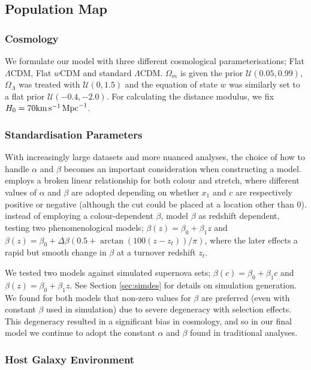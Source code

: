 \documentclass[a4paper,fleqn,usenatbib]{mnras}
\newcommand{\kmsmpc}{{\rm km}\,{\rm s}^{-1}\,{\rm Mpc}^{-1}}
\newcommand{\rubin}{\citetalias{Rubin2015}}
\begin{document}
\subsection{Population Map}

\subsubsection{Cosmology}

We formulate our model with three different cosmological parameterisations; Flat $\Lambda$CDM, Flat $w$CDM and standard $\Lambda$CDM. $\Omega_m$ is given the prior $\mathcal{U}(0.05, 0.99)$, $\Omega_\Lambda$ was treated with $\mathcal{U}(0, 1.5)$ and the equation of state $w$ was similarly set to a flat prior $\mathcal{U}(-0.4, -2.0)$. For calculating the distance modulus, we fix $H_0 = 70 \kmsmpc $. 

\subsubsection{Standardisation Parameters}

With increasingly large datasets and more nuanced analyses, the choice of how to handle $\alpha$ and $\beta$ becomes an important consideration when constructing a model. {\rubin} employs a broken linear relationship for both colour and stretch, where different values of $\alpha$ and $\beta$ are adopted depending on whether $x_1$ and $c$ are respectively positive or negative (although the cut could be placed at a location other than 0). \citet{Shariff2016} instead of employing a colour-dependent $\beta$, model $\beta$ as redshift dependent, testing two phenomenological models; $\beta(z) = \beta_0 + \beta_1 z$ and $\beta(z) = \beta_0 + \Delta \beta\left(0.5 + \arctan(100(z - z_t)) / \pi\right)$, where the later effects a rapid but smooth change in $\beta$ at a turnover redshift $z_t$.

We tested two models against simulated supernova sets; $\beta(c) = \beta_0 + \beta_1 c$ and $\beta(z) = \beta_0 + \beta_1 z$. See Section \ref{sec:simdes} for details on simulation generation. We found for both models that non-zero values for $\beta$ are preferred (even with constant $\beta$ used in simulation) due to severe degeneracy with selection effects. This degeneracy resulted in a significant bias in cosmology, and so in our final model we continue to adopt the constant $\alpha$ and $\beta$ found in traditional analyses.

\subsubsection{Host Galaxy Environment}
\end{document}
